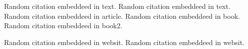 \documentclass{article}
\begin{document}
Random citation \autocite[1]{DUMMY:1} embeddeed in text.
Random citation \autocite{DUMMY:1} embeddeed in text.
Random citation \autocite{ARTICLE:1} embeddeed in article.
Random citation \autocite{BOOK:1} embeddeed in book.
Random citation \autocite{BOOK:2} embeddeed in book2.


Random citation \autocite{WEBSITE:2} embeddeed in websit.
Random citation \autocite{wiki:xxx} embeddeed in websit.

\newpage

\printbibliography
\end{document}
